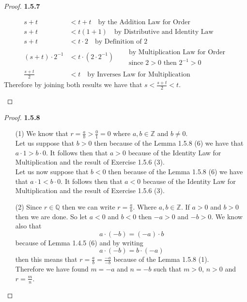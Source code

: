 \documentclass[11pt]{article}
\newcommand{\Z}{\mathbb{Z}}
\newcommand{\Q}{\mathbb{Q}}
\theoremstyle{definition}
\begin{document}
\begin{proof}{\textbf{1.5.7}}
\begin{itemize}
\begin{align*}
            s+t&<t+t \quad \text{by the Addition Law for Order}\\
            s+t&<t(1+1) \quad \text{by Distributive and Identity Law}\\
            s+t &< t\cdot 2 \quad \text{by Definition of 2}\\
            (s+t) \cdot 2^{-1} &< t \cdot (2\cdot 2^{-1}) \quad
                \begin{aligned}
                    &\text{by Multiplication Law for Order}\\
                    &\text{since }2>0\text{ then }2^{-1}>0
                \end{aligned}\\
            \frac{s+t}{2} &< t \quad \text{by Inverses Law for Multiplication}
        \end{align*}
        Therefore by joining both results we have that $s<\frac{s+t}{2}<t$.
    \end{itemize}        
    \end{proof}
    \begin{proof}{\textbf{1.5.8}}
    \begin{itemize}
        \item [(1)]
        We know that $r=\frac{a}{b}>\frac{0}{1}=0$ where $a,b \in \Z$ and $b \neq 0$.\\
        Let us suppose that $b>0$ then because of the Lemma 1.5.8 (6) we have that
        $a\cdot 1 > b\cdot 0$. It follows then that $a>0$ because of the Identity Law
        for Multiplication and the result of Exercise 1.5.6 (3).\\
        Let us now suppose that $b<0$ then because of the Lemma 1.5.8 (6) we have that
        $a\cdot 1 < b\cdot 0$. It follows then that $a<0$ because of the Identity Law
        for Multiplication and the result of Exercise 1.5.6 (3).
        \item [(2)]
        Since $r\in \Q$ then we can write $r=\frac{a}{b}$. Where $a,b \in \Z$.
        If $a>0$ and $b>0$ then we are done. So let $a<0$ and $b<0$ then $-a>0$ and $-b>0$. 
        We know also that
        $$a\cdot(-b) = (-a)\cdot b$$
        because of Lemma 1.4.5 (6) and by writing
        $$a\cdot(-b) = b\cdot (-a)$$
        then this means that $r = \frac{a}{b} = \frac{-a}{-b}$ because of the Lemma 1.5.8 (1).\\
        Therefore we have found $m=-a$ and $n=-b$ such that $m>0$, $n>0$ and $r = \frac{m}{n}$.
    \end{itemize}
    \end{proof}
\end{document}
